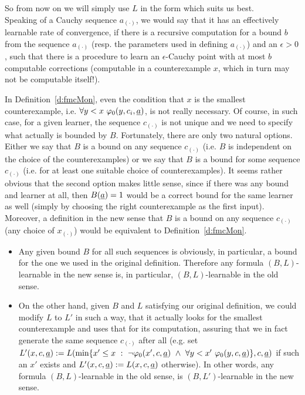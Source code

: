 So from now on we will simply use $L$ in the form which suits us best.
\\[2mm] 
Speaking of a Cauchy sequence $a_{(\cdot)}$, we would say that it has an effectively learnable rate of convergence, if there is a recursive 
computation for a bound $b$ from the sequence $a_{(\cdot)}$ (resp. the 
parameters used in defining $a_{(\cdot)}$) and an  
$\epsilon >0$, such that there is a procedure to learn 
an $\epsilon$-Cauchy point with at most $b$ computable corrections (computable in a counterexample $x$, which in turn may not be computable itself!).
\begin{rmk}\label{r:smallestCE}
In Definition~\ref{d:fmcMon}, even the condition that $x$ is the smallest counterexample, i.e. $\forall y<x\ \varphi_0(y,c_i,\underline a)$, 
is not really necessary. Of course, in such
case, for a given learner, the sequence $c_{(\cdot)}$ is not unique and we need to specify what actually is bounded by $B$. Fortunately, there are only two natural options.
 Either we say that $B$ is a bound on any sequence $c_{(\cdot)}$ (i.e. $B$ is independent on
the choice of the counterexamples) or we say that $B$ is a bound for some sequence $c_{(\cdot)}$ (i.e. for at least one suitable choice of counterexamples). 
It seems rather obvious that the second option makes little sense, since if there was any bound and learner at all, 
then $B(\underline a)=1$ would be a correct bound for the same learner as well (simply by choosing the right counterexample as the first input).
Moreover, a definition in the new sense that $B$ is a bound on any sequence $c_{(\cdot)}$ (any choice of $x_{(\cdot)}$) would be equivalent to Definition~\ref{d:fmcMon}.
\begin{itemize} 
\item Any given bound $B$ for all such sequences is obviously, in particular, a bound for the one we used in the original definition. 
Therefore any formula $(B,L)$-learnable in the new sense is, in particular, $(B,L)$-learnable in the old sense.
\item On the other hand, given $B$ and $L$ satisfying our original definition, we could modify $L$ to $L'$ in such a way, that it actually looks for the smallest counterexample and uses that for its computation, assuring that we in fact generate the same sequence $c_{(\cdot)}$ after all (e.g. set 
$L'(x,c,\tup a):=L(\min \{x'\leq x\ :\  \neg\phi_0(x',c,\tup a)\ \wedge\ \forall y<x'\ \phi_0(y,c,\tup a)\},c,\tup a)$ if such an $x'$ exists and 
$L'(x,c,\underline a):=L(x,c,\underline a)$ otherwise). In other words, any formula $(B,L)$-learnable in the old sense, is $(B,L')$-learnable in the new sense.
\end{itemize}
\end{rmk}

